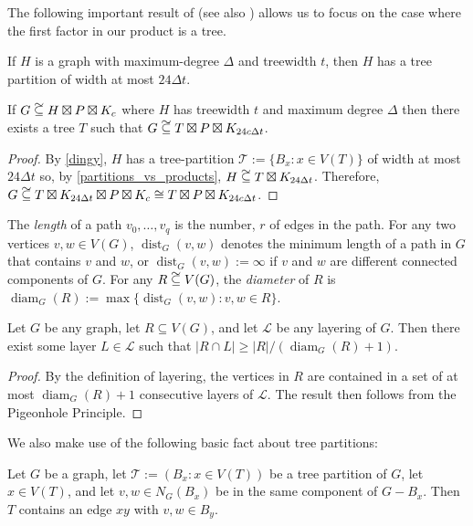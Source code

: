 \documentclass{patmorin}
\newcommand{\defin}[1]{\emph{\color{brightmaroon}#1}}
\DeclareMathOperator{\dist}{dist}
\DeclareMathOperator{\diam}{diam}
\renewcommand{\ge}{\geqslant}
\newcommand\subsetcong{\mathrel{\text{%
    \setbox0\hbox{$\subseteq$}%
    \rlap{\hbox to \wd0{\hss\hss\hss\raisebox{1.5\height}{$\sim$}\hss}}\box0
}}}
\begin{document}
The following important result of \citet{ding.oporowski:on} (see also \citet{wood:on}) allows us to focus on the case where the first factor in our product is a tree.

\begin{thm}\label{dingy}
  If $H$ is a graph with maximum-degree $\Delta$ and treewidth $t$, then $H$ has a tree partition of width at most $24\Delta t$.
\end{thm}

\begin{cor}\label{ding_translation}
  If $G\subsetcong H\boxtimes P\boxtimes K_c$ where $H$ has treewidth $t$ and maximum degree $\Delta$ then there exists a tree $T$ such that $G\subsetcong T\boxtimes P\boxtimes K_{24c\Delta t}$.
\end{cor}

\begin{proof}
  By \cref{dingy}, $H$ has a tree-partition $\mathcal{T}:=\{B_x:x\in V(T)\}$ of width at most $24\Delta t$ so, by \cref{partitions_vs_products}, $H \subsetcong T\boxtimes K_{24\Delta t}$.  Therefore, $G\subsetcong T\boxtimes K_{24\Delta t}\boxtimes P\boxtimes K_c \cong T\boxtimes P\boxtimes K_{24c\Delta t}$.
\end{proof}

The \defin{length} of a path $v_0,\ldots,v_q$ is the number, $r$ of edges in the path. For any two vertices $v,w\in V(G)$, $\dist_G(v,w)$ denotes the minimum length of a path in $G$ that contains $v$ and $w$, or $\dist_G(v,w):=\infty$ if $v$ and $w$ are different connected components of $G$. For any $R\subsetcong V(G)$, the \defin{diameter} of $R$ is $\diam_G(R):=\max\{\dist_G(v,w):v,w\in R\}$.

\begin{obs}\label{diameter_spread}
  Let $G$ be any graph, let $R\subseteq V(G)$, and let $\mathcal{L}$ be any layering of $G$.  Then there exist some layer $L\in\mathcal{L}$ such that $|R\cap L|\ge |R|/(\diam_G(R)+1)$.
\end{obs}

\begin{proof}
  By the definition of layering, the vertices in $R$ are contained in a set of at most $\diam_G(R)+1$ consecutive layers of $\mathcal{L}$. The result then follows from the Pigeonhole Principle.
\end{proof}


We also make use of the following basic fact about tree partitions:

\begin{obs}\label{tree_thingy}
  Let $G$ be a graph, let $\mathcal{T}:=(B_x:x\in V(T))$ be a tree partition of $G$, let $x\in V(T)$, and let $v,w\in N_G(B_x)$ be in the same component of $G-B_x$.  Then $T$ contains an edge $xy$ with $v,w\in B_y$.
\end{obs}
\end{document}
